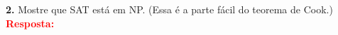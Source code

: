 
\noindent\textbf{2.} Mostre que SAT está em NP. (Essa é a parte fácil do teorema de Cook.)\\[6pt]
\textcolor{red}{\textbf{Resposta:}}